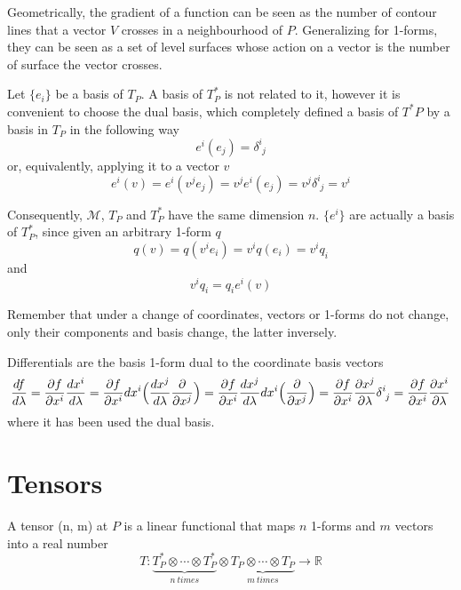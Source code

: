     Geometrically, the gradient of a function can be seen as the number of contour lines that a vector $V$ crosses in a neighbourhood of $P$. Generalizing for 1-forms, they can be seen as a set of level surfaces whose action on a vector is the number of surface the vector crosses. 

    Let $\{e_i\}$ be a basis of $T_P$. A basis of $T^*_P$ is not related to it, however it is convenient to choose the dual basis, which completely defined a basis of $T^*P$ by a basis in $T_P$ in the following way
    \begin{equation}\label{dual}
        e^i(e_j) = \delta^i_{\phantom i j}
    \end{equation}
    or, equivalently, applying it to a vector $v$
    \begin{equation*}
        e^i(v) = e^i(v^j e_j) = v^j e^i(e_j) = v^j \delta^i_{\phantom i j} = v^i
    \end{equation*}

    Consequently, $\mathcal M$, $T_P$ and $T^*_P$ have the same dimension $n$. $\{e^i\}$ are actually a basis of $T^*_P$, since given an arbitrary 1-form $q$
    \begin{equation*}
        q(v) = q(v^i e_i) = v^i q(e_i) = v^i q_i
    \end{equation*}
    and
    \begin{equation*}
        v^i q_i = q_i e^i(v)
    \end{equation*}

    Remember that under a change of coordinates, vectors or 1-forms do not change, only their components and basis change, the latter inversely.

    Differentials are the basis 1-form dual to the coordinate basis vectors 
    \begin{equation*}
        \dv{f}{\lambda} = \pdv{f}{x^i} \dv{x^i}{\lambda} = \pdv{f}{x^i} dx^i \Big(\dv{x^j}{\lambda} \pdv{}{x^j} \Big) = \pdv{f}{x^i} \dv{x^j}{\lambda} dx^i \Big ( \pdv{}{x^j} \Big) = \pdv{f}{x^i} \pdv{x^j}{\lambda} \delta^i_{\phantom i j} = \pdv{f}{x^i} \pdv{x^i}{\lambda}
    \end{equation*}
    where it has been used the dual basis.

\section{Tensors}  

    A tensor (n, m) at $P$ is a linear functional that maps $n$ 1-forms and $m$ vectors into a real number 
    \begin{equation*}
        T \colon \underbrace{T^*_P \otimes \cdots \otimes T^*_P}_{n~times} \otimes \underbrace{T_P \otimes \cdots \otimes T_P}_{m~times} \rightarrow \mathbb R
    \end{equation*}


